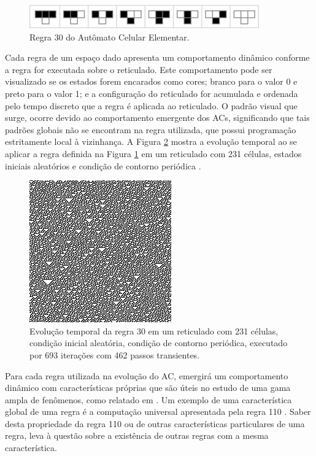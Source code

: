 \documentclass[12pt,a4paper]{report}
\begin{document}
	\begin{figure}[H]
		\centering
		\includegraphics[scale=1.25]{./img/regra_30_ace}
		\caption{Regra 30 do Autômato Celular Elementar.}
		\label{fig:rule30}
	\end{figure}
	
	Cada regra de um espaço dado apresenta um comportamento dinâmico conforme a regra for executada sobre o reticulado. Este comportamento pode ser visualizado se os estados forem encarados como cores; branco para o valor 0 e preto para o valor 1; e a configuração do reticulado for acumulada e ordenada pelo tempo discreto que a regra é aplicada ao reticulado. O padrão visual que surge, ocorre devido ao comportamento emergente dos ACs, significando que tais padrões globais não se encontram na regra utilizada, que possui programação estritamente local à vizinhança. A Figura \ref{fig:et30} mostra a evolução temporal ao se aplicar a regra definida na Figura \ref{fig:rule30} em um reticulado com 231 células, estados iniciais aleatórios e condição de contorno periódica \cite{2002:NKS:513738}.
	
	\begin{figure}[H]
		\centering
		\includegraphics[scale=1]{./img/ca_sample_30.png}
		\caption{Evolução temporal da regra 30 em um reticulado com 231 células, condição inicial aleatória, condição de contorno periódica, executado por 693 iterações com 462 passos transientes.}
		\label{fig:et30}
	\end{figure}
	
	Para cada regra utilizada na evolução do AC, emergirá um comportamento dinâmico com características próprias que são úteis no estudo de uma gama ampla de fenômenos, como relatado em . Um exemplo de uma característica global de uma regra é a computação universal apresentada pela regra 110 \cite{Neary:2006:PCA:2135489.2135507}. Saber desta propriedade da regra 110 ou de outras características particulares de uma regra, leva à questão sobre a existência de outras regras com a mesma característica.
	
\end{document}
